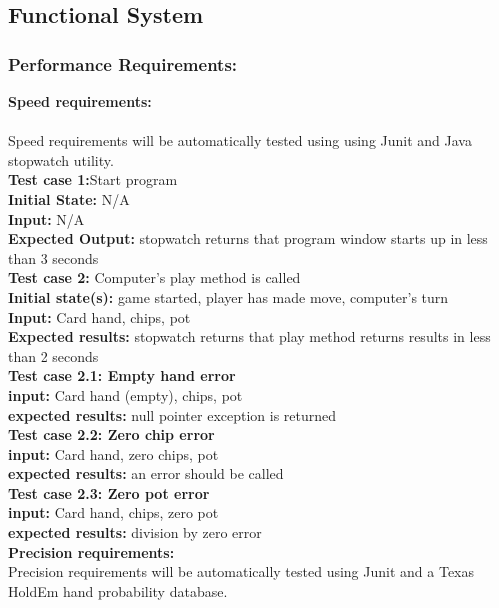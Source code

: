 \documentclass[12pt]{article}
\begin{document}
	\subsection{Functional System}
	\subsubsection{Performance Requirements:}
	\textbf{Speed requirements:}\\
	\\
    Speed requirements will be automatically tested using using Junit and Java stopwatch utility.
	\\
	\textbf{Test case 1:}Start program\\
	\textbf{Initial State:} N/A\\
	\textbf{Input:} N/A\\
	\textbf{Expected Output:} stopwatch returns that program window starts up in less than 3 seconds\\

	\noindent \textbf{Test case 2:} Computer’s play method is called\\
	\textbf{Initial state(s):} game started, player has made move, computer's turn\\
	\textbf{Input:} Card hand, chips, pot\\
	\textbf{Expected results:} stopwatch returns that play method returns results in less than 2 seconds\\

	\noindent \textbf{Test case 2.1: Empty hand error}\\
	\textbf{input:} Card hand (empty), chips, pot\\
	\textbf{expected results:} null pointer exception is returned\\

	\noindent \textbf{Test case 2.2: Zero chip error}\\
	\textbf{input:} Card hand, zero chips, pot\\
	\textbf{expected results:} an error should be called\\

	\noindent \textbf{Test case 2.3: Zero pot error}\\
	\textbf{input:} Card hand, chips, zero pot\\
	\textbf{expected results:} division by zero error\\

	\noindent \textbf{Precision requirements:}\\
    Precision requirements will be automatically tested using Junit and a Texas HoldEm hand 
            probability database.\\
\end{document}
